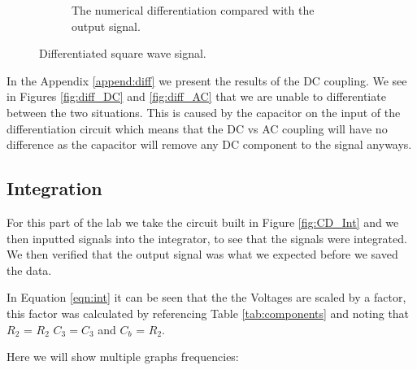 \begin{figure}[h!]
\begin{subfigure}[t]{.475\textwidth}
  \caption{The numerical differentiation compared with the output signal.}
\label{fig:diff_triangular_unfilter}
\end{subfigure}
\caption{Differentiated square wave signal.}
\label{fig:diff_triangular}
\end{figure}

In the Appendix \ref{append:diff} we present the results of the DC coupling. We see in Figures \ref{fig:diff_DC} and \ref{fig:diff_AC} that we are unable to differentiate between the two situations. This is caused by the capacitor on the input of the differentiation circuit which means that the DC vs AC coupling will have no difference as the capacitor will remove any DC component to the signal anyways.

\subsection{Integration}
For this part of the lab we take the circuit built in Figure \ref{fig:CD_Int} and we then inputted signals into the integrator, to see that the signals were integrated. We then verified that the output signal was what we expected before we saved the data.

In Equation \ref{eqn:int} it can be seen that the the Voltages are scaled by a factor, this factor was calculated by referencing Table \ref{tab:components} and noting that $R_2$ = $R_2$ $C_3 = C_3$ and $C_b$ = $R_2$. 

Here we will show multiple graphs frequencies:

